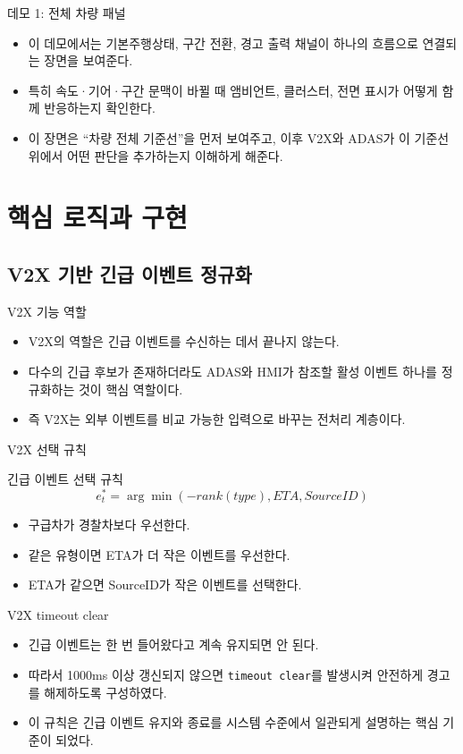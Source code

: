 \documentclass[aspectratio=169,10pt]{beamer}
\begin{document}
\begin{frame}{데모 1: 전체 차량 패널}
\begin{itemize}
  \item 이 데모에서는 기본주행상태, 구간 전환, 경고 출력 채널이 하나의 흐름으로 연결되는 장면을 보여준다.
  \item 특히 속도·기어·구간 문맥이 바뀔 때 앰비언트, 클러스터, 전면 표시가 어떻게 함께 반응하는지 확인한다.
  \item 이 장면은 ``차량 전체 기준선''을 먼저 보여주고, 이후 V2X와 ADAS가 이 기준선 위에서 어떤 판단을 추가하는지 이해하게 해준다.
\end{itemize}
\end{frame}

\section{핵심 로직과 구현}
\subsection{V2X 기반 긴급 이벤트 정규화}

\begin{frame}{V2X 기능 역할}
\begin{itemize}
  \item V2X의 역할은 긴급 이벤트를 수신하는 데서 끝나지 않는다.
  \item 다수의 긴급 후보가 존재하더라도 ADAS와 HMI가 참조할 활성 이벤트 하나를 정규화하는 것이 핵심 역할이다.
  \item 즉 V2X는 외부 이벤트를 비교 가능한 입력으로 바꾸는 전처리 계층이다.
\end{itemize}
\end{frame}

\begin{frame}{V2X 선택 규칙}
\begin{block}{긴급 이벤트 선택 규칙}
\[
e_t^*=\arg\min(-rank(type), ETA, SourceID)
\]
\end{block}
\begin{itemize}
  \item 구급차가 경찰차보다 우선한다.
  \item 같은 유형이면 ETA가 더 작은 이벤트를 우선한다.
  \item ETA가 같으면 SourceID가 작은 이벤트를 선택한다.
\end{itemize}
\end{frame}

\begin{frame}{V2X timeout clear}
\begin{itemize}
  \item 긴급 이벤트는 한 번 들어왔다고 계속 유지되면 안 된다.
  \item 따라서 1000ms 이상 갱신되지 않으면 \texttt{timeout clear}를 발생시켜 안전하게 경고를 해제하도록 구성하였다.
  \item 이 규칙은 긴급 이벤트 유지와 종료를 시스템 수준에서 일관되게 설명하는 핵심 기준이 되었다.
\end{itemize}
\end{frame}
\end{document}
